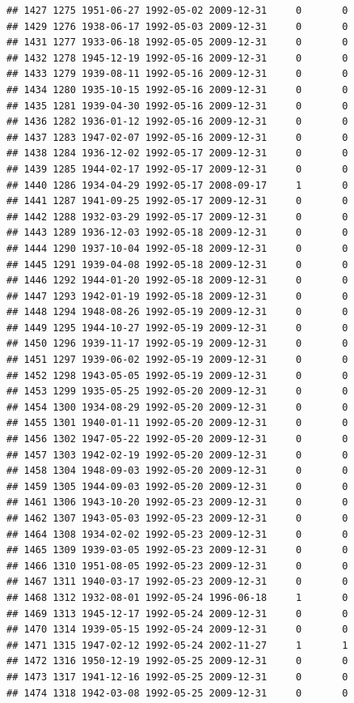 \documentclass[
]{book}
\theoremstyle{definition}
\theoremstyle{definition}
\theoremstyle{definition}
\theoremstyle{definition}
\theoremstyle{remark}
\begin{document}
\begin{verbatim}
## 1427 1275 1951-06-27 1992-05-02 2009-12-31     0       0
## 1429 1276 1938-06-17 1992-05-03 2009-12-31     0       0
## 1431 1277 1933-06-18 1992-05-05 2009-12-31     0       0
## 1432 1278 1945-12-19 1992-05-16 2009-12-31     0       0
## 1433 1279 1939-08-11 1992-05-16 2009-12-31     0       0
## 1434 1280 1935-10-15 1992-05-16 2009-12-31     0       0
## 1435 1281 1939-04-30 1992-05-16 2009-12-31     0       0
## 1436 1282 1936-01-12 1992-05-16 2009-12-31     0       0
## 1437 1283 1947-02-07 1992-05-16 2009-12-31     0       0
## 1438 1284 1936-12-02 1992-05-17 2009-12-31     0       0
## 1439 1285 1944-02-17 1992-05-17 2009-12-31     0       0
## 1440 1286 1934-04-29 1992-05-17 2008-09-17     1       0
## 1441 1287 1941-09-25 1992-05-17 2009-12-31     0       0
## 1442 1288 1932-03-29 1992-05-17 2009-12-31     0       0
## 1443 1289 1936-12-03 1992-05-18 2009-12-31     0       0
## 1444 1290 1937-10-04 1992-05-18 2009-12-31     0       0
## 1445 1291 1939-04-08 1992-05-18 2009-12-31     0       0
## 1446 1292 1944-01-20 1992-05-18 2009-12-31     0       0
## 1447 1293 1942-01-19 1992-05-18 2009-12-31     0       0
## 1448 1294 1948-08-26 1992-05-19 2009-12-31     0       0
## 1449 1295 1944-10-27 1992-05-19 2009-12-31     0       0
## 1450 1296 1939-11-17 1992-05-19 2009-12-31     0       0
## 1451 1297 1939-06-02 1992-05-19 2009-12-31     0       0
## 1452 1298 1943-05-05 1992-05-19 2009-12-31     0       0
## 1453 1299 1935-05-25 1992-05-20 2009-12-31     0       0
## 1454 1300 1934-08-29 1992-05-20 2009-12-31     0       0
## 1455 1301 1940-01-11 1992-05-20 2009-12-31     0       0
## 1456 1302 1947-05-22 1992-05-20 2009-12-31     0       0
## 1457 1303 1942-02-19 1992-05-20 2009-12-31     0       0
## 1458 1304 1948-09-03 1992-05-20 2009-12-31     0       0
## 1459 1305 1944-09-03 1992-05-20 2009-12-31     0       0
## 1461 1306 1943-10-20 1992-05-23 2009-12-31     0       0
## 1462 1307 1943-05-03 1992-05-23 2009-12-31     0       0
## 1464 1308 1934-02-02 1992-05-23 2009-12-31     0       0
## 1465 1309 1939-03-05 1992-05-23 2009-12-31     0       0
## 1466 1310 1951-08-05 1992-05-23 2009-12-31     0       0
## 1467 1311 1940-03-17 1992-05-23 2009-12-31     0       0
## 1468 1312 1932-08-01 1992-05-24 1996-06-18     1       0
## 1469 1313 1945-12-17 1992-05-24 2009-12-31     0       0
## 1470 1314 1939-05-15 1992-05-24 2009-12-31     0       0
## 1471 1315 1947-02-12 1992-05-24 2002-11-27     1       1
## 1472 1316 1950-12-19 1992-05-25 2009-12-31     0       0
## 1473 1317 1941-12-16 1992-05-25 2009-12-31     0       0
## 1474 1318 1942-03-08 1992-05-25 2009-12-31     0       0

\end{verbatim}
\end{document}
